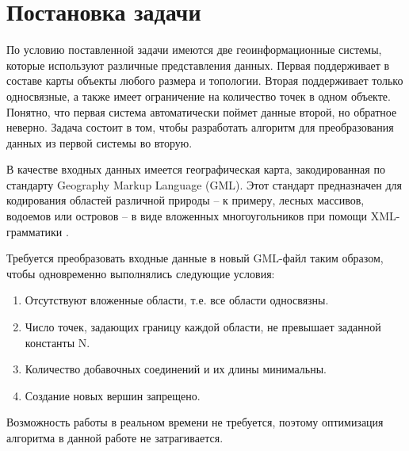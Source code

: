 \section{Постановка задачи}
\label{}

По условию поставленной задачи имеются две геоинформационные системы, которые используют различные представления данных. Первая поддерживает в составе карты объекты любого размера и топологии. Вторая поддерживает только односвязные, а также имеет ограничение на количество точек в одном объекте. Понятно, что первая система автоматически поймет данные второй, но обратное неверно. Задача состоит в том, чтобы разработать алгоритм для преобразования данных из первой системы во вторую.

В качестве входных данных имеется географическая карта, закодированная по стандарту Geography Markup Language (GML). Этот стандарт предназначен для кодирования областей различной природы – к примеру, лесных массивов, водоемов или островов – в виде вложенных многоугольников при помощи XML-грамматики \cite{noauthor_geography_nodate}. 

Требуется преобразовать входные данные в новый GML-файл таким образом, чтобы одновременно выполнялись следующие условия:

\begin{enumerate}
\item Отсутствуют вложенные области, т.е. все области односвязны.
\item Число точек, задающих границу каждой области, не превышает заданной константы N.
\item Количество добавочных соединений и их длины минимальны.
\item Создание новых вершин запрещено.
\end{enumerate}

Возможность работы в реальном времени не требуется, поэтому оптимизация алгоритма в данной работе не затрагивается.